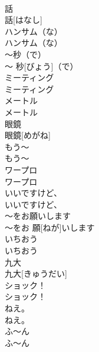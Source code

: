 \documentclass[8pt]{extreport}
\begin{document}
\begin{CJK}{UTF8}{min}
\\	話	
\\	話[はなし]		
\\	ハンサム（な）	
\\	ハンサム（な）		
\\	〜秒（で）	
\\	〜 秒[びょう]（で）		
\\	ミーティング	
\\	ミーティング		
\\	メートル	
\\	メートル		
\\	眼鏡	
\\	眼鏡[めがね]		
\\	もう〜	
\\	もう〜		
\\	ワープロ	
\\	ワープロ		
\\	いいですけど、	
\\	いいですけど、		
\\	〜をお願いします	
\\	〜をお 願[ねが]いします		
\\	いちおう	
\\	いちおう		
\\	九大	
\\	九大[きゅうだい]		
\\	ショック！	
\\	ショック！		
\\	ねえ。	
\\	ねえ。		
\\	ふ〜ん	
\\	ふ〜ん		
\end{CJK}
\end{document}
